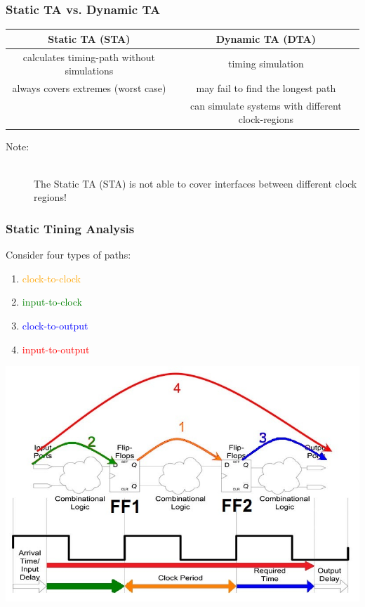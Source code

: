 \newpage
\subsubsection{Static TA vs. Dynamic TA}
\begin{table}[!h]
	\centering
	\begin{tabular}{|c|c|}
		\hline
		         \textbf{Static TA (STA)}          &             \textbf{Dynamic TA (DTA)}             \\ \hline\hline
		calculates timing-path without simulations &                 timing simulation                 \\ \hline
		   always covers extremes  (worst case)    &         may fail to find the longest path         \\ \hline
		                                           & can simulate systems with different clock-regions \\ \hline
	\end{tabular}
\end{table}

\begin{description}
	\item[Note:] \hfill \\
		The Static TA (STA) is not able to cover interfaces between different clock regions!
\end{description}

\subsubsection{Static Tining Analysis}
\begin{multicols}{2}
    Consider four types of paths:
    \begin{enumerate}
        \item \textcolor{orange}{clock-to-clock}
        \item \textcolor{green}{input-to-clock}
        \item \textcolor{blue}{clock-to-output}
        \item \textcolor{red}{input-to-output}
    \end{enumerate}
    \vfill
    \columnbreak
    \includegraphics[width=0.7\linewidth]{images/High_Speed_Digital/HSDigital_TimingAnalysis.jpg}
\end{multicols}

